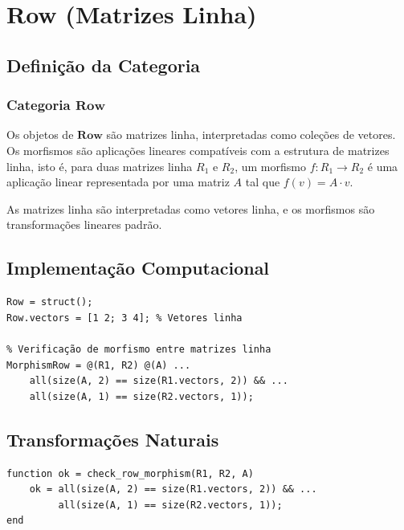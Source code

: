 \section{Row (Matrizes Linha)}
\label{sec:row}

\subsection{Definição da Categoria}

\subsubsection{Categoria $\mathbf{Row}$}

\begin{definition}
    Os objetos de $\mathbf{Row}$ são matrizes linha, interpretadas como coleções de vetores.
    Os morfismos são aplicações lineares compatíveis com a estrutura de matrizes linha, isto é, para duas matrizes linha $R_1$ e $R_2$, um morfismo $f: R_1 \to R_2$ é uma aplicação linear representada por uma matriz $A$ tal que $f(v) = A \cdot v$.
\end{definition}

\begin{remark}
    As matrizes linha são interpretadas como vetores linha, e os morfismos são transformações lineares padrão.
\end{remark}

\subsection{Implementação Computacional}

\begin{lstlisting}[style=matlab]
% Definição de uma matriz linha
Row = struct();
Row.vectors = [1 2; 3 4]; % Vetores linha

% Verificação de morfismo entre matrizes linha
MorphismRow = @(R1, R2) @(A) ...
    all(size(A, 2) == size(R1.vectors, 2)) && ...
    all(size(A, 1) == size(R2.vectors, 1));
\end{lstlisting}

\subsection{Transformações Naturais}
\begin{lstlisting}[style=matlab]
function ok = check_row_morphism(R1, R2, A)
    ok = all(size(A, 2) == size(R1.vectors, 2)) && ...
         all(size(A, 1) == size(R2.vectors, 1));
end
\end{lstlisting}